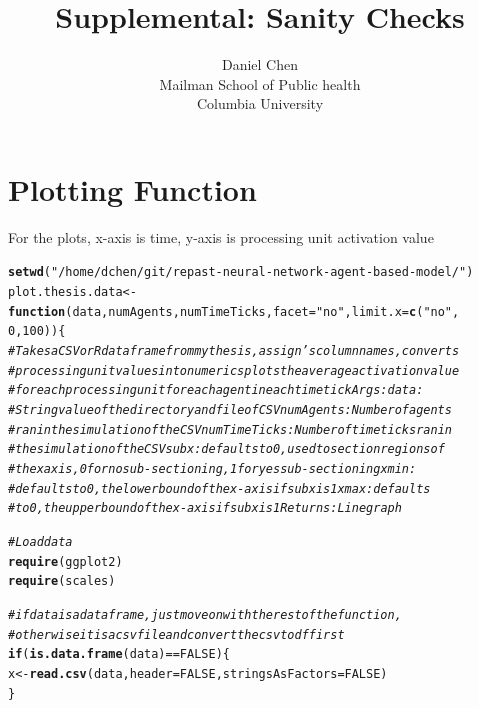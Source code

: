 \documentclass{article}\usepackage[]{graphicx}\usepackage[]{color}
\title{Supplemental: Sanity Checks}
\author{Daniel Chen \\ Mailman School of Public health \\ Columbia University}
\date{}
\makeatletter
\newcommand{\hlnum}[1]{\textcolor[rgb]{0.686,0.059,0.569}{#1}}%
\newcommand{\hlstr}[1]{\textcolor[rgb]{0.192,0.494,0.8}{#1}}%
\newcommand{\hlcom}[1]{\textcolor[rgb]{0.678,0.584,0.686}{\textit{#1}}}%
\newcommand{\hlopt}[1]{\textcolor[rgb]{0,0,0}{#1}}%
\newcommand{\hlstd}[1]{\textcolor[rgb]{0.345,0.345,0.345}{#1}}%
\newcommand{\hlkwa}[1]{\textcolor[rgb]{0.161,0.373,0.58}{\textbf{#1}}}%
\newcommand{\hlkwb}[1]{\textcolor[rgb]{0.69,0.353,0.396}{#1}}%
\newcommand{\hlkwc}[1]{\textcolor[rgb]{0.333,0.667,0.333}{#1}}%
\newcommand{\hlkwd}[1]{\textcolor[rgb]{0.737,0.353,0.396}{\textbf{#1}}}%
\newenvironment{kframe}{%
 \def\at@end@of@kframe{}%
 \ifinner\ifhmode%
  \def\at@end@of@kframe{\end{minipage}}%
  \begin{minipage}{\columnwidth}%
 \fi\fi%
 \def\FrameCommand##1{\hskip\@totalleftmargin \hskip-\fboxsep
 \colorbox{shadecolor}{##1}\hskip-\fboxsep
     \hskip-\linewidth \hskip-\@totalleftmargin \hskip\columnwidth}%
 \MakeFramed {\advance\hsize-\width
   \@totalleftmargin\z@ \linewidth\hsize
   \@setminipage}}%
 {\par\unskip\endMakeFramed%
 \at@end@of@kframe}
\newenvironment{knitrout}{}{} %
\makeatother
\begin{document}
\maketitle
\tableofcontents

\newpage

\section{Plotting Function}
\label{sec:plot-function}
For the plots, x-axis is time, y-axis is processing unit activation value

\begin{knitrout}
\color{fgcolor}\begin{kframe}
\begin{alltt}
\hlkwd{setwd}\hlstd{(}\hlstr{"/home/dchen/git/repast-neural-network-agent-based-model/"}\hlstd{)}
\hlstd{plot.thesis.data} \hlkwb{<-} \hlkwa{function}\hlstd{(}\hlkwc{data}\hlstd{,} \hlkwc{numAgents}\hlstd{,} \hlkwc{numTimeTicks}\hlstd{,} \hlkwc{facet} \hlstd{=} \hlstr{"no"}\hlstd{,} \hlkwc{limit.x} \hlstd{=} \hlkwd{c}\hlstd{(}\hlstr{"no"}\hlstd{,}
    \hlnum{0}\hlstd{,} \hlnum{100}\hlstd{)) \{}
    \hlcom{# Takes a CSV or R dataframe from my thesis, assign's column names, converts}
    \hlcom{# processing unit values into numerics plots the average activation value}
    \hlcom{# for each processing unit for each agent in each time tick Args: data:}
    \hlcom{# String value of the directory and file of CSV numAgents: Number of agents}
    \hlcom{# ran in the simulation of the CSV numTimeTicks: Number of time ticks ran in}
    \hlcom{# the simulation of the CSV subx: defaults to 0, used to section regions of}
    \hlcom{# the x axis, 0 for no sub-sectioning, 1 for yes sub-sectioning xmin:}
    \hlcom{# defaults to 0, the lower bound of the x-axis if subx is 1 xmax: defaults}
    \hlcom{# to 0, the upper bound of the x-axis if subx is 1 Returns: Line graph}

    \hlcom{# Load data}
    \hlkwd{require}\hlstd{(ggplot2)}
    \hlkwd{require}\hlstd{(scales)}

    \hlcom{# if data is a dataframe, just move on with the rest of the function,}
    \hlcom{# otherwise it is a csv file and convert the csv to df first}
    \hlkwa{if} \hlstd{(}\hlkwd{is.data.frame}\hlstd{(data)} \hlopt{==} \hlnum{FALSE}\hlstd{) \{}
        \hlstd{x} \hlkwb{<-} \hlkwd{read.csv}\hlstd{(data,} \hlkwc{header} \hlstd{=} \hlnum{FALSE}\hlstd{,} \hlkwc{stringsAsFactors} \hlstd{=} \hlnum{FALSE}\hlstd{)}
    \hlstd{\}}


\end{alltt}
\end{kframe}
\end{knitrout}
\end{document}
